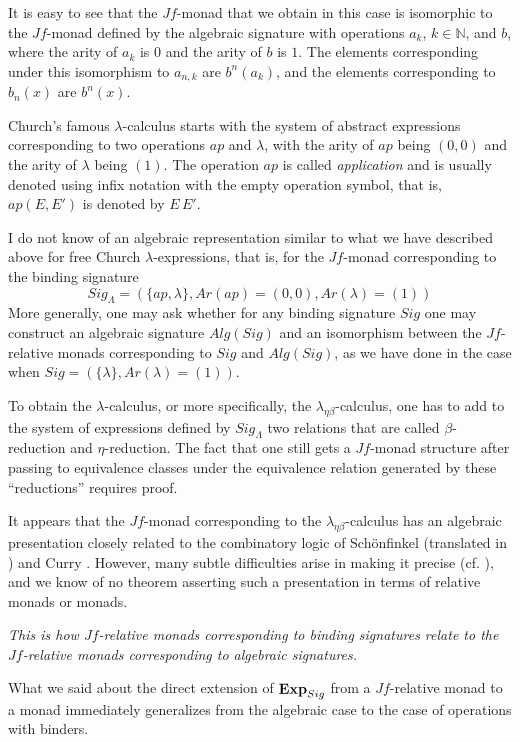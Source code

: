 \documentclass[onecolumn,12pt]{amsart}
\numberwithin{proposition}{subsection}
\newcommand{\nn}{{\mathbb N}}
\newcommand{\nat}{\nn}
\begin{document}
It is easy to see that the $Jf$-monad that we obtain in this case is isomorphic
to the $Jf$-monad defined by the algebraic signature with operations $a_k$,
$k\in\nat$, and $b$, where the arity of $a_k$ is $0$ and the arity of $b$ is
$1$. The elements corresponding under this isomorphism to $a_{n,k}$ are
$b^n(a_k)$, and the elements corresponding to $b_n(x)$ are $b^n(x)$.

Church's famous $\lambda$-calculus starts with the system of abstract
expressions corresponding to two operations $ap$ and $\lambda$, with the arity
of $ap$ being $(0,0)$ and the arity of $\lambda$ being $(1)$.  The operation $ap$ is
called {\em application} and is usually denoted using infix notation with the
empty operation symbol, that is, $ap(E,E')$ is denoted by $E\,E'$.

I do not know of an algebraic representation similar to what we have described
above for free Church $\lambda$-expressions, that is, for the $Jf$-monad
corresponding to the binding signature
%
$$Sig_{\Lambda}=(\{ap,\lambda\}, Ar(ap)=(0,0), Ar(\lambda)=(1))$$
%
More generally, one may ask whether for any binding signature $Sig$ one may
construct an algebraic signature $Alg(Sig)$ and an isomorphism between the
$Jf$-relative monads corresponding to $Sig$ and $Alg(Sig)$, as we have done in
the case when $Sig=(\{\lambda\},Ar(\lambda)=(1))$.

To obtain the $\lambda$-calculus, or more specifically, the
$\lambda_{\eta\beta}$-calculus, one has to add to the system of expressions
defined by $Sig_{\Lambda}$ two relations that are called $\beta$-reduction and 
$\eta$-reduction. The fact that one still gets a $Jf$-monad structure after
passing to equivalence classes under the equivalence relation generated by
these ``reductions'' requires proof.

It appears that the $Jf$-monad corresponding to the
$\lambda_{\eta\beta}$-calculus has an algebraic presentation closely related to
the combinatory logic of Schönfinkel \cite{Schonfinkel1924} (translated in
\cite{FtoG}) and Curry \cite{Curry1930}.  However, many subtle difficulties arise
in making it precise (cf.{} \cite{2002Selinger}), and we know of no theorem
asserting such a presentation in terms of relative monads or monads.

{\em This is how $Jf$-relative monads corresponding to binding signatures
  relate to the $Jf$-relative monads corresponding to algebraic signatures.}

What we said about the direct extension of ${\bf Exp}_{Sig}$ from a
$Jf$-relative monad to a monad immediately generalizes from the algebraic case
to the case of operations with binders.
\end{document}
